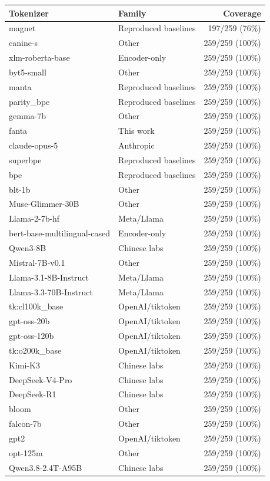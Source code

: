 \documentclass{standalone}
\begin{document}
\begin{tabular}{llr}
\toprule
Tokenizer & Family & Coverage \\
\midrule
magnet & Reproduced baselines & 197/259 (76\%) \\
canine-s & Other & 259/259 (100\%) \\
xlm-roberta-base & Encoder-only & 259/259 (100\%) \\
byt5-small & Other & 259/259 (100\%) \\
manta & Reproduced baselines & 259/259 (100\%) \\
parity\_bpe & Reproduced baselines & 259/259 (100\%) \\
gemma-7b & Other & 259/259 (100\%) \\
fanta & This work & 259/259 (100\%) \\
claude-opus-5 & Anthropic & 259/259 (100\%) \\
superbpe & Reproduced baselines & 259/259 (100\%) \\
bpe & Reproduced baselines & 259/259 (100\%) \\
blt-1b & Other & 259/259 (100\%) \\
Muse-Glimmer-30B & Other & 259/259 (100\%) \\
Llama-2-7b-hf & Meta/Llama & 259/259 (100\%) \\
bert-base-multilingual-cased & Encoder-only & 259/259 (100\%) \\
Qwen3-8B & Chinese labs & 259/259 (100\%) \\
Mistral-7B-v0.1 & Other & 259/259 (100\%) \\
Llama-3.1-8B-Instruct & Meta/Llama & 259/259 (100\%) \\
Llama-3.3-70B-Instruct & Meta/Llama & 259/259 (100\%) \\
tk:cl100k\_base & OpenAI/tiktoken & 259/259 (100\%) \\
gpt-oss-20b & OpenAI/tiktoken & 259/259 (100\%) \\
gpt-oss-120b & OpenAI/tiktoken & 259/259 (100\%) \\
tk:o200k\_base & OpenAI/tiktoken & 259/259 (100\%) \\
Kimi-K3 & Chinese labs & 259/259 (100\%) \\
DeepSeek-V4-Pro & Chinese labs & 259/259 (100\%) \\
DeepSeek-R1 & Chinese labs & 259/259 (100\%) \\
bloom & Other & 259/259 (100\%) \\
falcon-7b & Other & 259/259 (100\%) \\
gpt2 & OpenAI/tiktoken & 259/259 (100\%) \\
opt-125m & Other & 259/259 (100\%) \\
Qwen3.8-2.4T-A95B & Chinese labs & 259/259 (100\%) \\
\bottomrule
\end{tabular}
\end{document}
